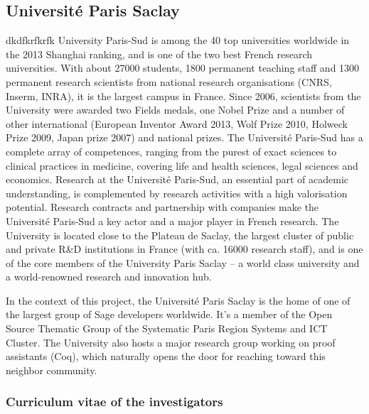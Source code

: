 \subsection*{Université Paris Saclay}

dkdfkrfkrfk
University Paris-Sud is among the 40 top universities worldwide in the
2013 Shanghai ranking, and is one of the two best French research
universities. With about 27000 students, 1800 permanent teaching staff
and 1300 permanent research scientists from national research
organisations (CNRS, Inserm, INRA), it is the largest campus in
France. Since 2006, scientists from the University were awarded two
Fields medals, one Nobel Prize and a number of other international
(European Inventor Award 2013, Wolf Prize 2010, Holweck Prize 2009,
Japan prize 2007) and national prizes.  The Université Paris-Sud has a
complete array of competences, ranging from the purest of exact
sciences to clinical practices in medicine, covering life and health
sciences, legal sciences and economics. Research at the Université
Paris-Sud, an essential part of academic understanding, is
complemented by research activities with a high valorisation
potential. Research contracts and partnership with companies make the
Université Paris-Sud a key actor and a major player in French
research.  The University is located close to the Plateau de Saclay,
the largest cluster of public and private R\&D institutions in France
(with ca. 16000 research staff), and is one of the core members of the
University Paris Saclay – a world class university and a
world-renowned research and innovation hub.

In the context of this project, the Université Paris Saclay is the
home of one of the largest group of Sage developers worldwide. It's a
member of the Open Source Thematic Group of the Systematic Paris
Region Systems and ICT Cluster. The University also hosts a major
research group working on proof assistants (Coq), which naturally
opens the door for reaching toward this neighbor community.


\subsubsection*{Curriculum vitae of the investigators}

%

%
%
%

